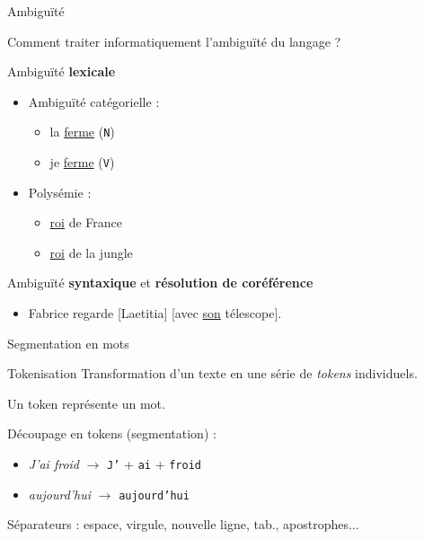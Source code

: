 \documentclass[xetex,xcolor={table,usenames,dvipsnames}]{beamer}
\begin{document}
\begin{frame}{Ambiguïté}
\begin{block}{\vspace{-6mm}}
	Comment traiter informatiquement l'ambiguïté du langage ?
\end{block}

Ambiguïté \textbf{lexicale}

\begin{itemize}
	\item Ambiguïté catégorielle :
	\begin{itemize}
		\item la \underline{ferme} (\texttt{N})
		\item je \underline{ferme} (\texttt{V})
	\end{itemize}
	\item Polysémie :
	\begin{itemize}
		\item \underline{roi} de France
		\item \underline{roi} de la jungle
	\end{itemize}
\end{itemize}



Ambiguïté \textbf{syntaxique} et \textbf{résolution de coréférence}
\begin{itemize}
	\item Fabrice regarde [Laetitia] [avec \underline{son} télescope].
\end{itemize}
%	
\end{frame}

\begin{frame}{Segmentation en mots}
	
	\begin{block}{Tokenisation}
			Transformation d'un texte en une série de \textit{tokens} individuels.
	\end{block}

	Un token représente un mot.
	
	 Découpage en tokens (segmentation) :
	\begin{itemize}
		\item \textit{J’ai froid} $\rightarrow$ \texttt{J'} + \texttt{ai} + \texttt{froid}
		\item \textit{aujourd'hui} $\rightarrow$ \texttt{aujourd'hui}
	\end{itemize}
	 Séparateurs : espace, virgule, nouvelle ligne, tab., apostrophes$\dots$
	
	
\end{frame}
\end{document}
